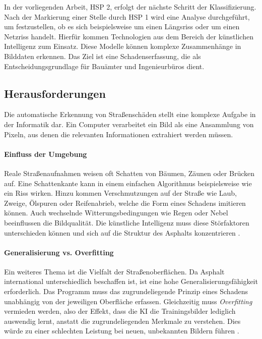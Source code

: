 In der vorliegenden Arbeit, HSP 2, erfolgt der nächste Schritt der Klassifizierung. Nach der Markierung einer Stelle durch HSP 1 wird eine Analyse durchgeführt, um festzustellen, ob es sich beispielsweise um einen Längsriss oder um einen Netzriss handelt. Hierfür kommen Technologien aus dem Bereich der künstlichen Intelligenz zum Einsatz. Diese Modelle können komplexe Zusammenhänge in Bilddaten erkennen. Das Ziel ist eine Schadenserfassung, die als Entscheidungsgrundlage für Bauämter und Ingenieurbüros dient.

\subsection{Herausforderungen}
\label{subsec:herausforderungen}

Die automatische Erkennung von Straßenschäden stellt eine komplexe Aufgabe in der Informatik dar. Ein Computer verarbeitet ein Bild als eine Ansammlung von Pixeln, aus denen die relevanten Informationen extrahiert werden müssen.

\paragraph{Einfluss der Umgebung}
Reale Straßenaufnahmen weisen oft Schatten von Bäumen, Zäunen oder Brücken auf. Eine Schattenkante kann in einem einfachen Algorithmus beispielsweise wie ein Riss wirken. Hinzu kommen Verschmutzungen auf der Straße wie Laub, Zweige, Ölspuren oder Reifenabrieb, welche die Form eines Schadens imitieren können. Auch wechselnde Witterungsbedingungen wie Regen oder Nebel beeinflussen die Bildqualität. Die künstliche Intelligenz muss diese Störfaktoren unterschieden können und sich auf die Struktur des Asphalts konzentrieren \cite[Kapitel 12.2]{goodfellow2016}.

\paragraph{Generalisierung vs. Overfitting}
Ein weiteres Thema ist die Vielfalt der Straßenoberflächen. Da Asphalt international unterschiedlich beschaffen ist, ist eine hohe Generalisierungsfähigkeit erforderlich. Das Programm muss das zugrundeliegende Prinzip eines Schadens unabhängig von der jeweiligen Oberfläche erfassen. Gleichzeitig muss \emph{Overfitting} vermieden werden, also der Effekt, dass die KI die Trainingsbilder lediglich auswendig lernt, anstatt die zugrundeliegenden Merkmale zu verstehen. Dies würde zu einer schlechten Leistung bei neuen, unbekannten Bildern führen \cite[Kapitel 4]{amaratunga2023}.

